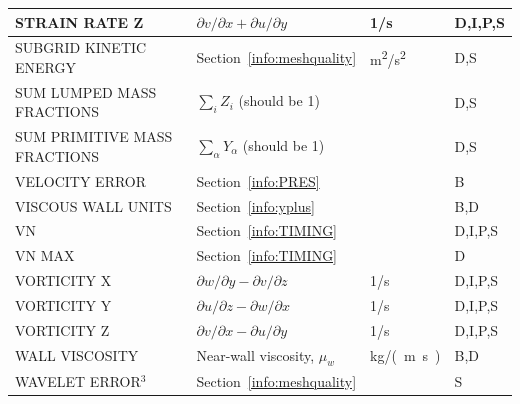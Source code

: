 \documentclass[11pt]{book}
\begin{document}
\begin{longtable}{@{\extracolsep{\fill}}|l|l|l|l|}
{\ct STRAIN RATE Z}                             & $\partial v/\partial x + \partial u/\partial y$   & 1/s            & D,I,P,S      \\ \hline
{\ct SUBGRID KINETIC ENERGY}                    & Section~\ref{info:meshquality}                    & \si{m^2/s^2}   & D,S          \\ \hline
{\ct SUM LUMPED MASS FRACTIONS}                 & $\sum_i Z_i$ (should be 1)                        &                & D,S          \\ \hline
{\ct SUM PRIMITIVE MASS FRACTIONS}              & $\sum_\alpha Y_\alpha$ (should be 1)              &                & D,S          \\ \hline
{\ct VELOCITY ERROR}                            & Section~\ref{info:PRES}                           &                & B            \\ \hline
{\ct VISCOUS WALL UNITS}                        & Section~\ref{info:yplus}                          &                & B,D          \\ \hline
{\ct VN}                                        & Section~\ref{info:TIMING}                         &                & D,I,P,S      \\ \hline
{\ct VN MAX}                                    & Section~\ref{info:TIMING}                         &                & D            \\ \hline
{\ct VORTICITY X}                               & $\partial w/\partial y - \partial v/\partial z$   & 1/s            & D,I,P,S      \\ \hline
{\ct VORTICITY Y}                               & $\partial u/\partial z - \partial w/\partial x$   & 1/s            & D,I,P,S      \\ \hline
{\ct VORTICITY Z}                               & $\partial v/\partial x - \partial u/\partial y$   & 1/s            & D,I,P,S      \\ \hline
{\ct WALL VISCOSITY}                            & Near-wall viscosity, $\mu_w$                      & \si{kg/(m.s)}  & B,D          \\ \hline
{\ct WAVELET ERROR}$^3$                         & Section~\ref{info:meshquality}                    &                & S            \\ \hline
\end{longtable}
\end{document}
